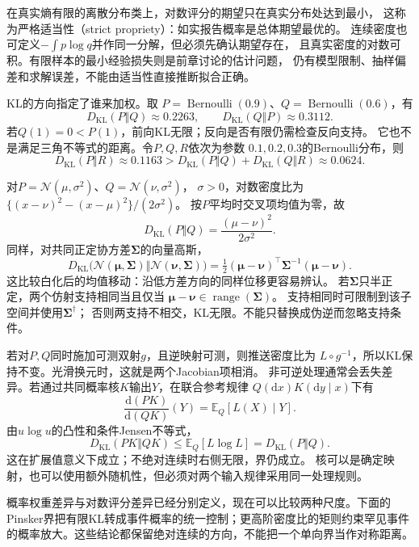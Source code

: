 在真实熵有限的离散分布类上，对数评分的期望只在真实分布处达到最小，
这称为严格适当性（strict propriety）：如实报告概率是总体期望最优的。
连续密度也可定义\(-\int p\log q\)并作同一分解，但必须先确认期望存在，
且真实密度的对数可积。有限样本的最小经验损失则是前章讨论的估计问题，
仍有模型限制、抽样偏差和求解误差，不能由适当性直接推断拟合正确。

KL的方向指定了谁来加权。取
\(P=\operatorname{Bernoulli}(0.9)\)、\(Q=\operatorname{Bernoulli}(0.6)\)，有
\[
  D_{\mathrm{KL}}(P\Vert Q)\approx0.2263,\qquad
  D_{\mathrm{KL}}(Q\Vert P)\approx0.3112.
\]
若\(Q(1)=0<P(1)\)，前向KL无限；反向是否有限仍需检查反向支持。
它也不是满足三角不等式的距离。令\(P,Q,R\)依次为参数
\(0.1,0.2,0.3\)的Bernoulli分布，则
\[
  D_{\mathrm{KL}}(P\Vert R)\approx0.1163
  >D_{\mathrm{KL}}(P\Vert Q)+D_{\mathrm{KL}}(Q\Vert R)
  \approx0.0624.
\]

对\(P=\mathcal N(\mu,\sigma^2)\)、\(Q=\mathcal N(\nu,\sigma^2)\)，
\(\sigma>0\)，对数密度比为
\(\{(x-\nu)^2-(x-\mu)^2\}/(2\sigma^2)\)。
按\(P\)平均时交叉项均值为零，故
\begin{equation}
  D_{\mathrm{KL}}(P\Vert Q)=\frac{(\mu-\nu)^2}{2\sigma^2}.
  \label{eq:information-gaussian-location-kl}
\end{equation}
同样，对共同正定协方差\(\bm\Sigma\)的向量高斯，
\begin{equation}
  D_{\mathrm{KL}}\bigl(
    \mathcal N(\bm\mu,\bm\Sigma)\Vert\mathcal N(\bm\nu,\bm\Sigma)\bigr)
  =\tfrac12(\bm\mu-\bm\nu)^\top\bm\Sigma^{-1}(\bm\mu-\bm\nu).
  \label{eq:information-vector-gaussian-translation-kl}
\end{equation}
这比较白化后的均值移动：沿低方差方向的同样位移更容易辨认。
若\(\bm\Sigma\)只半正定，两个仿射支持相同当且仅当
\(\bm\mu-\bm\nu\in\operatorname{range}(\bm\Sigma)\)。
支持相同时可限制到该子空间并使用\(\bm\Sigma^\dagger\)；
否则两支持不相交，KL无限。不能只替换成伪逆而忽略支持条件。

若对\(P,Q\)同时施加可测双射\(g\)，且逆映射可测，则推送密度比为
\(L\circ g^{-1}\)，所以KL保持不变。光滑换元时，这就是两个Jacobian项相消。
非可逆处理通常会丢失差异。若通过共同概率核\(K\)输出\(Y\)，在联合参考规律
\(Q(\mathrm dx)K(\mathrm dy\mid x)\)下有
\[
  \frac{\mathrm d(PK)}{\mathrm d(QK)}(Y)=\mathbb E_Q[L(X)\mid Y].
\]
由\(u\log u\)的凸性和条件Jensen不等式，
\[
  D_{\mathrm{KL}}(PK\Vert QK)
  \leq\mathbb E_Q[L\log L]=D_{\mathrm{KL}}(P\Vert Q).
\]
这在扩展值意义下成立；不绝对连续时右侧无限，界仍成立。
核可以是确定映射，也可以使用额外随机性，但必须对两个输入规律采用同一处理规则。

\par\medskip
概率权重差异与对数评分差异已经分别定义，现在可以比较两种尺度。下面的Pinsker界把有限KL转成事件概率的统一控制；更高阶密度比的矩则约束罕见事件的概率放大。这些结论都保留绝对连续的方向，不能把一个单向界当作对称距离。

